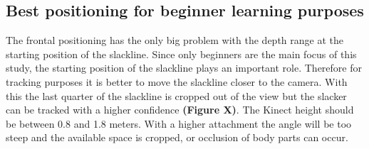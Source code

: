 \subsection{Best positioning for beginner learning purposes}
The frontal positioning has the only big problem with the depth range at the starting position of the slackline. Since only beginners are the main focus of this study, the starting position of the slackline plays an important role. Therefore for tracking purposes it is better to move the slackline closer to the camera. With this the last quarter of the slackline is cropped out of the view but the slacker can be tracked with a higher confidence \textbf{(Figure X)}. The Kinect height should be between 0.8 and 1.8 meters. With a higher attachment the angle will be too steep and the available space is cropped, or occlusion of body parts can occur.

